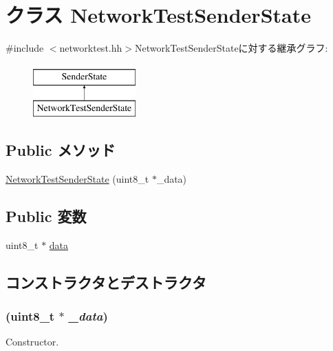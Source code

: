 \hypertarget{classNetworkTest_1_1NetworkTestSenderState}{
\section{クラス NetworkTestSenderState}
\label{classNetworkTest_1_1NetworkTestSenderState}
}


{\ttfamily \#include $<$networktest.hh$>$}NetworkTestSenderStateに対する継承グラフ:\begin{figure}[H]
\begin{center}
\leavevmode
\includegraphics[height=2cm]{classNetworkTest_1_1NetworkTestSenderState}
\end{center}
\end{figure}
\subsection*{Public メソッド}
\begin{DoxyCompactItemize}
\item 
\hyperlink{classNetworkTest_1_1NetworkTestSenderState_aa08ea9d805d702d34103e03fbe4c476c}{NetworkTestSenderState} (uint8\_\-t $\ast$\_\-data)
\end{DoxyCompactItemize}
\subsection*{Public 変数}
\begin{DoxyCompactItemize}
\item 
uint8\_\-t $\ast$ \hyperlink{classNetworkTest_1_1NetworkTestSenderState_abe222f6d3581e7920dcad5306cc906a8}{data}
\end{DoxyCompactItemize}


\subsection{コンストラクタとデストラクタ}
\hypertarget{classNetworkTest_1_1NetworkTestSenderState_aa08ea9d805d702d34103e03fbe4c476c}{
\subsubsection[{NetworkTestSenderState}]{ (uint8\_\-t $\ast$ {\em \_\-data})}}
\label{classNetworkTest_1_1NetworkTestSenderState_aa08ea9d805d702d34103e03fbe4c476c}
Constructor. 


